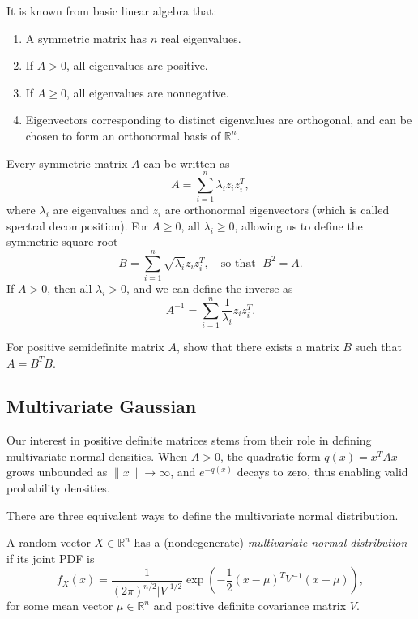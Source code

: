 \documentclass{article}
\begin{document}
It is known from basic linear algebra that:
\begin{enumerate}
    \item A symmetric matrix has $n$ real eigenvalues.
    \item If $A > 0$, all eigenvalues are positive.
    \item If $A \ge 0$, all eigenvalues are nonnegative.
    \item Eigenvectors corresponding to distinct eigenvalues are orthogonal, and
    can be chosen to form an orthonormal basis of $\mathbb{R}^n$.
\end{enumerate}

Every symmetric matrix $A$ can be written as
\[
A = \sum_{i=1}^{n} \lambda_i z_i z_i^T,
\]
where $\lambda_i$ are eigenvalues and $z_i$ are orthonormal eigenvectors (which is called spectral decomposition).
For $A \ge 0$, all $\lambda_i \ge 0$, allowing us to define the symmetric
square root
\[
B = \sum_{i=1}^{n} \sqrt{\lambda_i} z_i z_i^T, \quad \text{so that } \; B^2 = A.
\]
If $A > 0$, then all $\lambda_i > 0$, and we can define the inverse as
\[
A^{-1} = \sum_{i=1}^{n} \frac{1}{\lambda_i} z_i z_i^T.
\]


\begin{exercise}
    For positive semidefinite matrix $A$, show that there exists a matrix $B$ such that $A = B^TB$.
\end{exercise}

\subsection{Multivariate Gaussian}

Our interest in positive definite matrices stems from their role in defining multivariate normal densities.
When $A > 0$, the quadratic form $q(x) = x^T A x$ grows unbounded as $\|x\| \to \infty$,
and $e^{-q(x)}$ decays to zero, thus enabling valid probability densities.

There are three equivalent ways to define the multivariate normal distribution.

\begin{definition}\label{def:MV1}
A random vector $X \in \mathbb{R}^n$ has a (nondegenerate) \emph{multivariate normal distribution} if its joint PDF is
\[
f_X(x) = \frac{1}{(2\pi)^{n/2} |V|^{1/2}}
\exp\left( -\frac{1}{2} (x - \mu)^T V^{-1} (x - \mu) \right),
\]
for some mean vector $\mu \in \mathbb{R}^n$ and positive definite covariance matrix $V$.
\end{definition}
\end{document}
